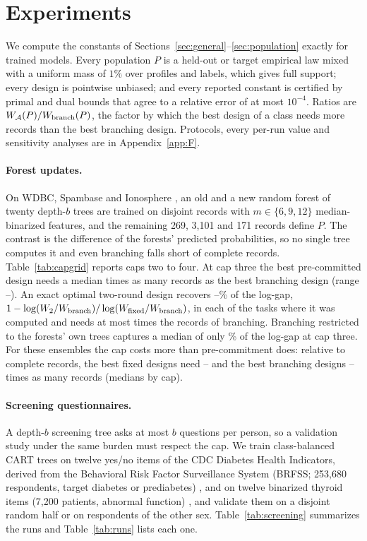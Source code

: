 \section{Experiments}\label{sec:experiments}
We compute the constants of Sections~\ref{sec:general}--\ref{sec:population} exactly for trained models. Every population $P$ is a held-out or target empirical law mixed with a uniform mass of $1\%$ over profiles and labels, which gives full support; every design is pointwise unbiased; and every reported constant is certified by primal and dual bounds that agree to a relative error of at most $10^{-4}$. Ratios are $W_\mathcal A(P)/W_{\rm branch}(P)$, the factor by which the best design of a class needs more records than the best branching design. Protocols, every per-run value and sensitivity analyses are in Appendix~\ref{app:F}.

\paragraph{Forest updates.}
On WDBC, Spambase and Ionosphere \citep{wolberg1993,spambase1999,ionosphere1989}, an old and a new random forest of twenty depth-$b$ trees are trained on disjoint records with $m\in\{6,9,12\}$ median-binarized features, and the remaining 269, 3,101 and 171 records define $P$. The contrast is the difference of the forests' predicted probabilities, so no single tree computes it and even branching falls short of complete records. Table~\ref{tab:capgrid} reports caps two to four. At cap three the best pre-committed design needs a median \nCapThreeMed{} times as many records as the best branching design (range \nCapThreeMin--\nCapThreeMax). An exact optimal two-round design recovers \nTwoForestLo--\nTwoForestHi\% of the log-gap, $1-\log(W_2/W_{\rm branch})/\log(W_{\rm fixed}/W_{\rm branch})$, in each of the \nTwoForestN{} tasks where it was computed and needs at most \nTwoForestRatioMax{} times the records of branching. Branching restricted to the forests' own trees captures a median of only \nCapThreeShare\% of the log-gap at cap three. For these ensembles the cap costs more than pre-commitment does: relative to complete records, the best fixed designs need \nCapFixLo--\nCapFixHi{} and the best branching designs \nCapBrLo--\nCapBrHi{} times as many records (medians by cap).




\paragraph{Screening questionnaires.}
A depth-$b$ screening tree asks at most $b$ questions per person, so a validation study under the same burden must respect the cap. We train class-balanced CART trees on twelve yes/no items of the CDC Diabetes Health Indicators, derived from the Behavioral Risk Factor Surveillance System (BRFSS; 253,680 respondents, target diabetes or prediabetes) \citep{cdcdiabetes2017}, and on twelve binarized thyroid items (7,200 patients, abnormal function) \citep{quinlan1986thyroid}, and validate them on a disjoint random half or on respondents of the other sex. Table~\ref{tab:screening} summarizes the runs and Table~\ref{tab:runs} lists each one.

